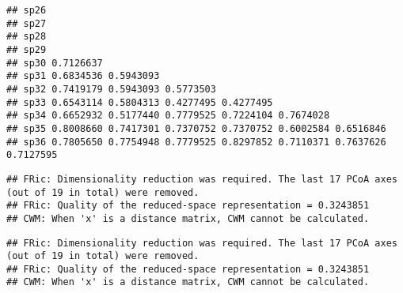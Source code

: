 \documentclass[
]{book}
\newenvironment{Shaded}{\begin{snugshade}}{\end{snugshade}}
\newcommand{\CommentTok}[1]{\textcolor[rgb]{0.56,0.35,0.01}{\textit{#1}}}
\newcommand{\KeywordTok}[1]{\textcolor[rgb]{0.13,0.29,0.53}{\textbf{#1}}}
\newcommand{\NormalTok}[1]{#1}
\newcommand{\OperatorTok}[1]{\textcolor[rgb]{0.81,0.36,0.00}{\textbf{#1}}}
\newcommand{\StringTok}[1]{\textcolor[rgb]{0.31,0.60,0.02}{#1}}
\begin{document}
\begin{verbatim}
## sp26                                                                      
## sp27                                                                      
## sp28                                                                      
## sp29                                                                      
## sp30 0.7126637                                                            
## sp31 0.6834536 0.5943093                                                  
## sp32 0.7419179 0.5943093 0.5773503                                        
## sp33 0.6543114 0.5804313 0.4277495 0.4277495                              
## sp34 0.6652932 0.5177440 0.7779525 0.7224104 0.7674028                    
## sp35 0.8008660 0.7417301 0.7370752 0.7370752 0.6002584 0.6516846          
## sp36 0.7805650 0.7754948 0.7779525 0.8297852 0.7110371 0.7637626 0.7127595
\end{verbatim}

\begin{Shaded}
\end{Shaded}

\begin{verbatim}
## FRic: Dimensionality reduction was required. The last 17 PCoA axes (out of 19 in total) were removed. 
## FRic: Quality of the reduced-space representation = 0.3243851 
## CWM: When 'x' is a distance matrix, CWM cannot be calculated.
\end{verbatim}

\begin{Shaded}
\end{Shaded}

\begin{verbatim}
## FRic: Dimensionality reduction was required. The last 17 PCoA axes (out of 19 in total) were removed. 
## FRic: Quality of the reduced-space representation = 0.3243851 
## CWM: When 'x' is a distance matrix, CWM cannot be calculated.
\end{verbatim}
\end{document}
